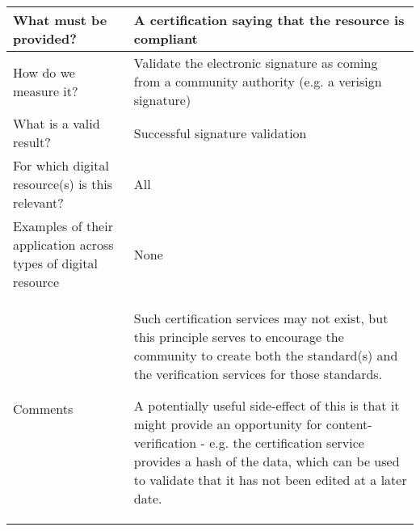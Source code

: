 \documentclass[english]{article}
\begin{document}
\begin{longtable}{|p{5cm}|p{9cm}|}
  
\\



\hline
What must be provided? &  

A certification saying that the resource is compliant


\\



\hline
How do we measure it? &  


Validate the electronic signature as coming from a community authority (e.g. a verisign signature)


\\



\hline
What is a valid result? &  


Successful signature validation


\\



\hline
For which digital resource(s) is this relevant? &  All\\



\hline
Examples of their application across types of digital resource &  None

\\



\hline

Comments & 


Such certification services may not exist, but this principle serves to encourage the community to create both the standard(s) and the verification services for those standards.  

A potentially useful side-effect of this is that it might provide an opportunity for content-verification - e.g. the certification service provides a hash of the data, which can be used to validate that it has not been edited at a later date.


\\
\hline

\end{longtable}
\end{document}
